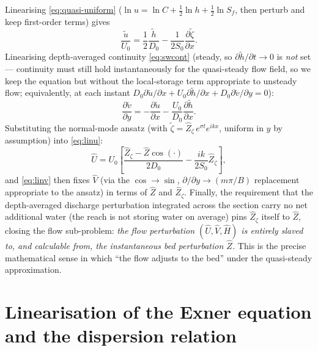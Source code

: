 \documentclass[11pt,a4paper]{report}
\theoremstyle{definition}
\theoremstyle{plain}
\theoremstyle{remark}
\newcommand{\pdv}[2]{\dfrac{\partial #1}{\partial #2}}
\begin{document}
Linearising \eqref{eq:quasi-uniform} ($\ln u = \ln C + \tfrac12\ln h + \tfrac12\ln S_f$, then perturb and keep first-order terms) gives
\begin{equation}
\frac{\tilde u}{U_0} = \frac12\frac{\tilde h}{D_0} - \frac{1}{2S_0}\pdv{\tilde \zeta}{x}.
\label{eq:linu}
\end{equation}
Linearising depth-averaged continuity \eqref{eq:swcont} (steady, so $\partial \tilde h/\partial t\to0$ is \emph{not} set — continuity must still hold instantaneously for the quasi-steady flow field, so we keep the equation but without the local-storage term appropriate to unsteady flow; equivalently, at each instant $D_0\partial \tilde u/\partial x + U_0\partial \tilde h/\partial x + D_0 \partial \tilde v/\partial y = 0$):
\begin{equation}
\pdv{\tilde v}{y} = -\pdv{\tilde u}{x} - \frac{U_0}{D_0}\pdv{\tilde h}{x}.
\label{eq:linv}
\end{equation}
Substituting the normal-mode ansatz (with $\tilde\zeta = \widehat Z_\zeta\, e^{\sigma t}e^{ikx}$, uniform in $y$ by assumption) into \eqref{eq:linu}:
\begin{equation}
\widehat U = U_0\left[\frac{\widehat Z_\zeta - \widehat Z\cos(\cdot)}{2D_0} - \frac{ik}{2S_0}\widehat Z_\zeta\right],
\end{equation}
and \eqref{eq:linv} then fixes $\widehat V$ (via the $\cos\to\sin$, $\partial/\partial y\to (m\pi/B)$ replacement appropriate to the ansatz) in terms of $\widehat Z$ and $\widehat Z_\zeta$. Finally, the requirement that the depth-averaged discharge perturbation integrated across the section carry no net additional water (the reach is not storing water on average) pins $\widehat Z_\zeta$ itself to $\widehat Z$, closing the flow sub-problem: \emph{the flow perturbation $(\widehat U,\widehat V,\widehat H)$ is entirely slaved to, and calculable from, the instantaneous bed perturbation $\widehat Z$.} This is the precise mathematical sense in which ``the flow adjusts to the bed'' under the quasi-steady approximation.

\section{Linearisation of the Exner equation and the dispersion relation}
\end{document}
